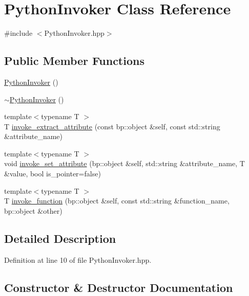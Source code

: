 \hypertarget{class_python_invoker}{}\section{Python\+Invoker Class Reference}
\label{class_python_invoker}


{\ttfamily \#include $<$Python\+Invoker.\+hpp$>$}

\subsection*{Public Member Functions}
\begin{DoxyCompactItemize}
\item 
\mbox{\hyperlink{class_python_invoker_a3eadddaabd90bd1058c294a31b09717e}{Python\+Invoker}} ()
\item 
\mbox{\hyperlink{class_python_invoker_a63094704db614104680f0afe19d32de1}{$\sim$\+Python\+Invoker}} ()
\item 
{\footnotesize template$<$typename T $>$ }\\T \mbox{\hyperlink{class_python_invoker_a97677482144e0d8f64b0c6f6fe6e6636}{invoke\+\_\+extract\+\_\+attribute}} (const bp\+::object \&self, const std\+::string \&attribute\+\_\+name)
\item 
{\footnotesize template$<$typename T $>$ }\\void \mbox{\hyperlink{class_python_invoker_ad824d1fc84b3544824923a63fce3d385}{invoke\+\_\+set\+\_\+attribute}} (bp\+::object \&self, std\+::string \&attribute\+\_\+name, T \&value, bool is\+\_\+pointer=false)
\item 
{\footnotesize template$<$typename T $>$ }\\T \mbox{\hyperlink{class_python_invoker_a5cbaab517bb6935227d422376c1a797d}{invoke\+\_\+function}} (bp\+::object \&self, const std\+::string \&function\+\_\+name, bp\+::object \&other)
\end{DoxyCompactItemize}


\subsection{Detailed Description}


Definition at line 10 of file Python\+Invoker.\+hpp.



\subsection{Constructor \& Destructor Documentation}
\mbox{\label{class_python_invoker_a3eadddaabd90bd1058c294a31b09717e}} 

